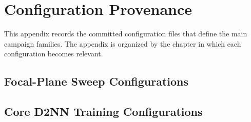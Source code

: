 \chapter{Configuration Provenance}

This appendix records the committed configuration files that define the main
campaign families. The appendix is organized by the chapter in which each
configuration becomes relevant.

\section{Focal-Plane Sweep Configurations}













\section{Core D2NN Training Configurations}





